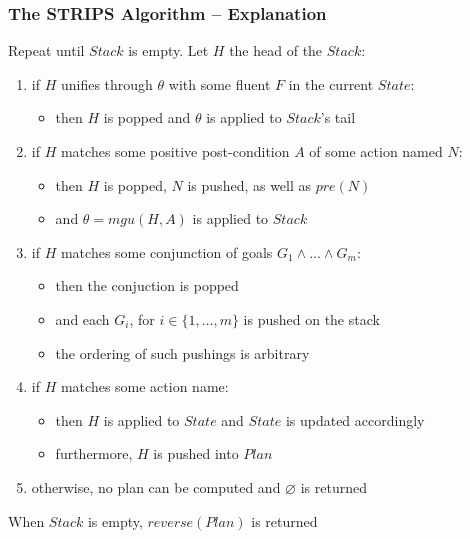 \documentclass[presentation]{beamer}\mode<presentation>{\usetheme{AMSBolognaFC}}
\begin{document}
\begin{frame}%
\small
\frametitle{The STRIPS Algorithm -- Explanation}

    Repeat until $Stack$ is empty. Let $H$ the head of the $Stack$:
    \begin{enumerate}
        \item if $H$ unifies through $\theta$ with some fluent $F$ in the current $State$:
        \begin{itemize}
            \item then $H$ is popped and $\theta$ is applied to $Stack$'s tail
        \end{itemize}

        \vfill

        \item if $H$ matches some \alert{positive} post-condition $A$ of some action named $N$:
        \begin{itemize}
            \item then $H$ is popped, $N$ is pushed, as well as $pre(N)$
            \item and $\theta = mgu(H, A)$ is applied to $Stack$
        \end{itemize}

        \vfill

        \item if $H$ matches some conjunction of goals $G_1 \wedge \ldots \wedge G_m$:
        \begin{itemize}
            \item then the conjuction is popped
            \item and each $G_i$, for $i \in \{1,\ldots,m\}$ is pushed on the stack
            \item the ordering of such pushings is arbitrary
        \end{itemize}

        \vfill

        \item if $H$ matches some action name:
        \begin{itemize}
            \item then $H$ is applied to $State$ and $State$ is updated accordingly
            \item furthermore, $H$ is pushed into $Plan$
        \end{itemize}

        \vfill

        \item otherwise, no plan can be computed and $\varnothing$ is returned
    \end{enumerate}

    \vfill

    When $Stack$ is empty, $reverse(Plan)$ is returned

\end{frame}
\end{document}
